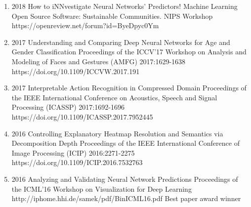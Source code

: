\documentclass[10pt,a4paper]{article} %
\begin{document}
{\begin{enumerate}
        \item {}
                                {2018}
                                {How to iNNvestigate Neural Networks' Predictors!}
                                {Machine Learning Open Source Software: Sustainable Communities. NIPS Workshop}
                                {}
                                {https://openreview.net/forum?id=ByeDpyc0Ym}


        \item {}
                                {2017}
                                {Understanding and Comparing Deep Neural Networks for Age and Gender Classification}
                                {Proceedings of the ICCV'17 Workshop on Analysis and Modeling of Faces and Gestures (AMFG)}
                                {2017:1629-1638}
                                {https://doi.org/10.1109/ICCVW.2017.191}

        \item {}
                                {2017}
                                {Interpretable Action Recognition in Compressed Domain}
                                {Proceedings of the IEEE International Conference on Acoustics, Speech and Signal Processing (ICASSP)}
                                {2017:1692-1696}
                                {https://doi.org/10.1109/ICASSP.2017.7952445}


        \item {}
                                {2016}
                                {Controlling Explanatory Heatmap Resolution and Semantics via Decomposition Depth}
                                {Proceedings of the IEEE International Conference of Image Processing (ICIP)}
                                {2016:2271-2275}
                                {https://doi.org/10.1109/ICIP.2016.7532763}


        \item {}
                                {2016}
                                {Analyzing and Validating Neural Network Predictions}
                                {Proceedings of the ICML'16 Workshop on Visualization for Deep Learning}
                                {}
                                {http://iphome.hhi.de/samek/pdf/BinICML16.pdf}
                                {Best paper award winner}


\end{enumerate}}
\end{document}
